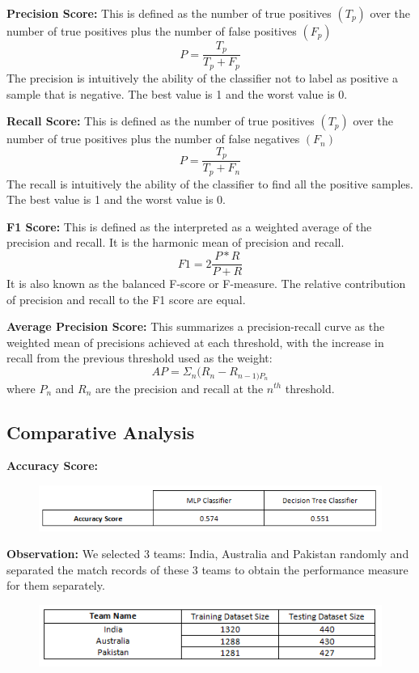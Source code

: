\documentclass[a4paper, 10pt, conference]{IEEEtran}
\begin{document}
\textbf{Precision Score:}
This is defined as the number of true positives $(T_{p})$ over the number of true positives plus the number of false positives $(F_{p})$
\[ P = \frac{T_{p}}{T_{p}+F_{p}}\]
The precision is intuitively the ability of the classifier not to label as positive a sample that is negative. 
The best value is 1 and the worst value is 0.

\textbf{Recall Score:}
This is defined as the number of true positives $(T_{p})$ over the number of true positives plus the number of false negatives $(F_{n})$
\[ P = \frac{T_{p}}{T_{p}+F_{n}}\]
The recall is intuitively the ability of the classifier to find all the positive samples. 
The best value is 1 and the worst value is 0.

\textbf{F1 Score:}
This is defined as the interpreted as a weighted average of the precision and recall. It is the harmonic mean of precision and recall.
\[ F1 = 2 \frac{P*R}{P+R}
\]
It is also known as the balanced F-score or F-measure. The relative contribution of precision and recall to the F1 score are equal.

\textbf{Average Precision Score:}
This summarizes a precision-recall curve as the weighted mean of precisions achieved at each threshold, with the increase in recall from the previous threshold used as the weight:
\[ AP = \Sigma_{n}(R_{n}-R_{n-1)P_{n}}\]
where \textit{$P_{n}$} and \textit{$R_{n}$} are the precision and recall at the \textit{$n^{th}$} threshold.

\subsection{Comparative Analysis}
\textbf{Accuracy Score:}
\begin{figure}[h!]
  \includegraphics[width=\linewidth]{ModelScore.png}
  \label{fig:scoremodel}
\end{figure}

\textbf{Observation:}
We selected 3 teams: India, Australia and Pakistan randomly and separated the match records of these 3 teams to obtain the performance measure for them separately.
\begin{figure}[h!]
  \includegraphics[width=\linewidth]{DatasetTeam.png}
  \label{fig:teamdata}
\end{figure}
\end{document}
